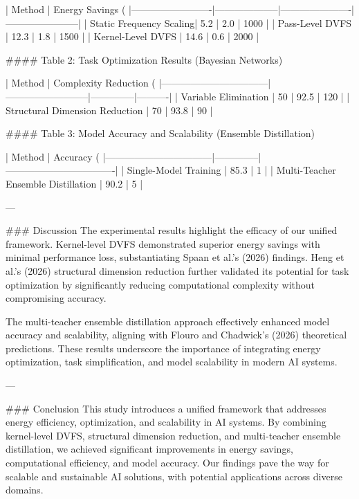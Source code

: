 | Method                  | Energy Savings (%
|-------------------------|--------------------|----------------------|-----------------------|
| Static Frequency Scaling| 5.2                | 2.0                  | 1000                 |
| Pass-Level DVFS         | 12.3               | 1.8                  | 1500                 |
| Kernel-Level DVFS       | 14.6               | 0.6                  | 2000                 |

#### Table 2: Task Optimization Results (Bayesian Networks)

| Method                          | Complexity Reduction (%
|---------------------------------|--------------------------|--------------|----------|
| Variable Elimination            | 50                       | 92.5         | 120      |
| Structural Dimension Reduction  | 70                       | 93.8         | 90       |

#### Table 3: Model Accuracy and Scalability (Ensemble Distillation)

| Method                          | Accuracy (%
|---------------------------------|--------------|----------------------------------|
| Single-Model Training           | 85.3         | 1                                |
| Multi-Teacher Ensemble Distillation | 90.2     | 5                                |

---

### Discussion  
The experimental results highlight the efficacy of our unified framework. Kernel-level DVFS demonstrated superior energy savings with minimal performance loss, substantiating Spaan et al.'s (2026) findings. Heng et al.'s (2026) structural dimension reduction further validated its potential for task optimization by significantly reducing computational complexity without compromising accuracy.

The multi-teacher ensemble distillation approach effectively enhanced model accuracy and scalability, aligning with Flouro and Chadwick's (2026) theoretical predictions. These results underscore the importance of integrating energy optimization, task simplification, and model scalability in modern AI systems.

---

### Conclusion  
This study introduces a unified framework that addresses energy efficiency, optimization, and scalability in AI systems. By combining kernel-level DVFS, structural dimension reduction, and multi-teacher ensemble distillation, we achieved significant improvements in energy savings, computational efficiency, and model accuracy. Our findings pave the way for scalable and sustainable AI solutions, with potential applications across diverse domains.


